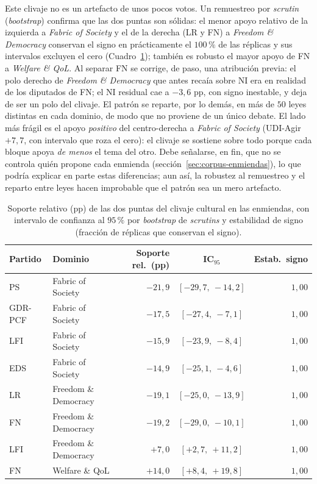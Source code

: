 Este clivaje no es un artefacto de unos pocos votos. Un remuestreo por
\emph{scrutin} (\emph{bootstrap}) confirma que las dos puntas son sólidas: el menor
apoyo relativo de la izquierda a \emph{Fabric of Society} y el de la derecha
(LR y FN) a \emph{Freedom \& Democracy} conservan el signo en prácticamente el
$100\,\%$ de las réplicas y sus intervalos excluyen el cero
(Cuadro~\ref{tab:clivaje-ci}); también es robusto el mayor apoyo de FN a
\emph{Welfare \& QoL}. Al separar FN se corrige, de paso, una atribución previa:
el polo derecho de \emph{Freedom \& Democracy} que antes recaía sobre NI era en
realidad de los diputados de FN; el NI residual cae a $-3{,}6$ pp, con signo
inestable, y deja de ser un polo del clivaje. El patrón se reparte, por lo demás,
en más de $50$ leyes distintas en cada dominio, de modo que no proviene de un
único debate. El lado más frágil es el apoyo \emph{positivo} del centro-derecha a
\emph{Fabric of Society} (UDI-Agir $+7{,}7$, con intervalo que roza el cero): el
clivaje se sostiene sobre todo porque cada bloque apoya \emph{de menos} el tema
del otro. Debe señalarse, en fin, que no se controla quién propone cada enmienda
(sección~\ref{sec:corpus-enmiendas}), lo que podría explicar en parte estas
diferencias; aun así, la robustez al remuestreo y el reparto entre leyes hacen
improbable que el patrón sea un mero artefacto.

\begin{table}[H]
\centering
\caption{Soporte relativo (pp) de las dos puntas del clivaje cultural en las
enmiendas, con intervalo de confianza al $95\,\%$ por \emph{bootstrap} de
\emph{scrutins} y estabilidad de signo (fracción de réplicas que conservan el signo).}
\label{tab:clivaje-ci}
\begin{tabular}{@{}l l r c r@{}}
\toprule
\textbf{Partido} & \textbf{Dominio} & \textbf{Soporte rel.\ (pp)} & \textbf{IC$_{95}$} & \textbf{Estab.\ signo} \\
\midrule
PS & Fabric of Society & $-21{,}9$ & $[-29{,}7,\ -14{,}2]$ & $1{,}00$ \\
GDR-PCF & Fabric of Society & $-17{,}5$ & $[-27{,}4,\ -7{,}1]$ & $1{,}00$ \\
LFI & Fabric of Society & $-15{,}9$ & $[-23{,}9,\ -8{,}4]$ & $1{,}00$ \\
EDS & Fabric of Society & $-14{,}9$ & $[-25{,}1,\ -4{,}6]$ & $1{,}00$ \\
LR & Freedom \& Democracy & $-19{,}1$ & $[-25{,}0,\ -13{,}9]$ & $1{,}00$ \\
FN & Freedom \& Democracy & $-19{,}2$ & $[-29{,}0,\ -10{,}1]$ & $1{,}00$ \\
LFI & Freedom \& Democracy & $+7{,}0$ & $[+2{,}7,\ +11{,}2]$ & $1{,}00$ \\
FN & Welfare \& QoL & $+14{,}0$ & $[+8{,}4,\ +19{,}8]$ & $1{,}00$ \\
\bottomrule
\end{tabular}
\end{table}

